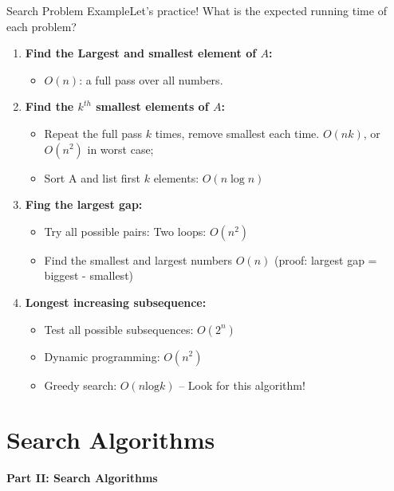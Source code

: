 \begin{frame}{Search Problem Example}{Let's practice!}
  What is the expected running time of each problem?
  \begin{enumerate}
  \item {\bf Find the Largest and smallest element of $A$:}
    \begin{itemize}
      \item $O(n)$: a full pass over all numbers.
    \end{itemize}
  \item {\bf Find the $k^{th}$ smallest elements of $A$:}
    \begin{itemize}
      \item Repeat the full pass $k$ times, remove smallest each time. $O(nk)$, or $O(n^2)$ in worst case;
      \item Sort A and list first $k$ elements: $O(n\log{n})$
    \end{itemize}
  \item {\bf Fing the largest gap:}
    \begin{itemize}
    \item Try all possible pairs: Two loops: $O(n^2)$
    \item Find the smallest and largest numbers $O(n)$ (proof: largest gap = biggest - smallest)
    \end{itemize}
  \item {\bf Longest increasing subsequence:}
    \begin{itemize}
    \item Test all possible subsequences: $O(2^n)$
    \item Dynamic programming: $O(n^2)$
    \item Greedy search: $O(n\text{log}k)$ -- Look for this algorithm!
    \end{itemize}
  \end{enumerate}
\end{frame}

\section{Search Algorithms}

\begin{frame}{}{}
  \begin{center}
    {\bf Part II: Search Algorithms}
  \end{center}
\end{frame}

